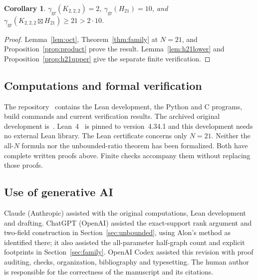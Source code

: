 \documentclass[screen]{aomart}
\newtheorem{corollary}[theorem]{Corollary}
\theoremstyle{definition}
\theoremstyle{remark}
\numberwithin{equation}{section}
\newcommand{\ggr}{\gamma_{\mathrm{gr}}}
\newcommand{\sprod}{\boxtimes}
\newcommand{\oct}{K_{2,2,2}}
\begin{document}
\begin{corollary}\label{thm:main}
$\ggr(\oct)=2$, $\ggr(H_{21})=10$, and
$\ggr(\oct\sprod H_{21})\ge21>2\cdot10$.
\end{corollary}
\begin{proof}
Lemma~\ref{lem:oct}, Theorem~\ref{thm:family} at $N=21$, and Proposition~\ref{prop:product} prove the result. Lemma~\ref{lem:h21lower} and Proposition~\ref{prop:h21upper} give the separate finite verification.
\end{proof}


\subsection*{Computations and formal verification}
The repository~\cite{Revision} contains the Lean development, the Python and C programs, build commands and current verification results. The archived original development is~\cite{Ar}. Lean~4~\cite{MU} is pinned to version~4.34.1 and this development needs no external Lean library. The Lean certificate concerns only $N=21$. Neither the all-$N$ formula nor the unbounded-ratio theorem has been formalized. Both have complete written proofs above. Finite checks accompany them without replacing those proofs.

\subsection*{Use of generative AI}
Claude (Anthropic) assisted with the original computations, Lean development and drafting. ChatGPT (OpenAI) assisted the exact-support rank argument and two-field construction in Section~\ref{sec:unbounded}, using Alon's method as identified there; it also assisted the all-parameter half-graph count and explicit footprints in Section~\ref{sec:family}. OpenAI Codex assisted this revision with proof auditing, checks, organization, bibliography and typesetting. The human author is responsible for the correctness of the manuscript and its citations.



\end{document}
